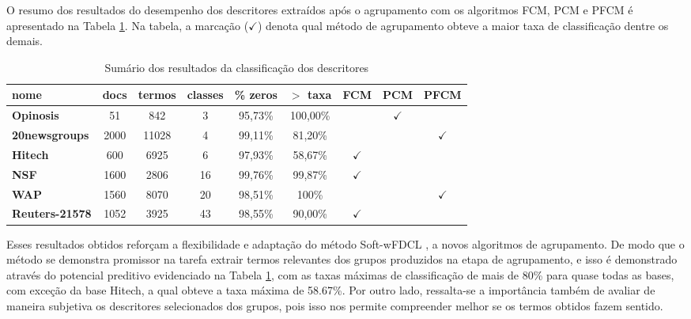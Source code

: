 O resumo dos resultados do desempenho dos descritores extraídos após o agrupamento com os
algoritmos FCM, PCM e PFCM é apresentado na Tabela \ref{table:pfcmsummary}. Na tabela, a marcação
($\checkmark$) denota qual método de agrupamento obteve a maior taxa de classificação dentre os
demais.

\begin{table}[!htp]
  \centering
  \begin{tabular}{ |l|c c c c c c c c|}
    \hline
    {\bf nome} & docs & termos & classes & \% zeros & $>$ taxa & FCM & PCM & PFCM \\
    \hline
    {\bf Opinosis} & 51 & 842 & 3 & 95,73\% & 100,00\% & & $\checkmark$ &  \\
    \hline
    {\bf 20newsgroups} & 2000 & 11028 & 4 & 99,11\% & 81,20\% & & & $\checkmark$\\
    \hline
    {\bf Hitech} & 600 & 6925 & 6 & 97,93\% & 58,67\% & $\checkmark$ & & \\
    \hline
    {\bf NSF} & 1600 & 2806 & 16 & 99,76\% & 99,87\% & $\checkmark$ & & \\
    \hline
    {\bf WAP} & 1560 & 8070 & 20 & 98,51\% & 100\% & & & $\checkmark$ \\
    \hline
    {\bf Reuters-21578} & 1052 & 3925 & 43 & 98,55\% & 90,00\% & $\checkmark$ & & \\
    \hline
  \end{tabular}
  \caption{Sumário dos resultados da classificação dos descritores}
  \label{table:pfcmsummary}
\end{table}

Esses resultados obtidos reforçam a flexibilidade e adaptação do método Soft-wFDCL
\cite{Nogueira2013}, a novos algoritmos de agrupamento. De modo que o método se demonstra promissor
na tarefa extrair termos relevantes dos grupos produzidos na etapa de agrupamento, e isso é
demonstrado através do potencial preditivo evidenciado na Tabela \ref{table:pfcmsummary}, com as
taxas máximas de classificação de mais de 80\% para quase todas as bases, com exceção da base
Hitech, a qual obteve a taxa máxima de 58.67\%.  Por outro lado, ressalta-se a importância também de
avaliar de maneira subjetiva os descritores selecionados dos grupos, pois isso nos permite
compreender melhor se os termos obtidos fazem sentido. 

